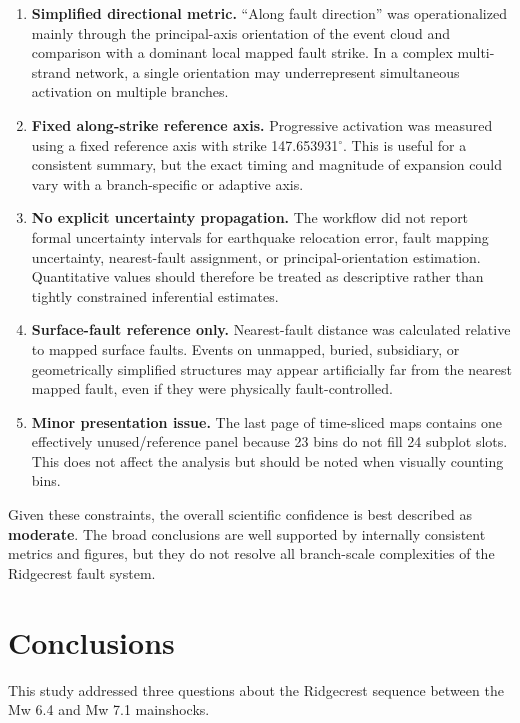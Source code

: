 \documentclass[11pt]{article}
\begin{document}
\begin{enumerate}[label=\arabic*.]
    \item \textbf{Simplified directional metric.} ``Along fault direction'' was operationalized mainly through the principal-axis orientation of the event cloud and comparison with a dominant local mapped fault strike. In a complex multi-strand network, a single orientation may underrepresent simultaneous activation on multiple branches.
    \item \textbf{Fixed along-strike reference axis.} Progressive activation was measured using a fixed reference axis with strike 147.653931$^{\circ}$. This is useful for a consistent summary, but the exact timing and magnitude of expansion could vary with a branch-specific or adaptive axis.
    \item \textbf{No explicit uncertainty propagation.} The workflow did not report formal uncertainty intervals for earthquake relocation error, fault mapping uncertainty, nearest-fault assignment, or principal-orientation estimation. Quantitative values should therefore be treated as descriptive rather than tightly constrained inferential estimates.
    \item \textbf{Surface-fault reference only.} Nearest-fault distance was calculated relative to mapped surface faults. Events on unmapped, buried, subsidiary, or geometrically simplified structures may appear artificially far from the nearest mapped fault, even if they were physically fault-controlled.
    \item \textbf{Minor presentation issue.} The last page of time-sliced maps contains one effectively unused/reference panel because 23 bins do not fill 24 subplot slots. This does not affect the analysis but should be noted when visually counting bins.
\end{enumerate}

Given these constraints, the overall scientific confidence is best described as \textbf{moderate}. The broad conclusions are well supported by internally consistent metrics and figures, but they do not resolve all branch-scale complexities of the Ridgecrest fault system.

\section{Conclusions}
This study addressed three questions about the Ridgecrest sequence between the Mw 6.4 and Mw 7.1 mainshocks.
\end{document}
